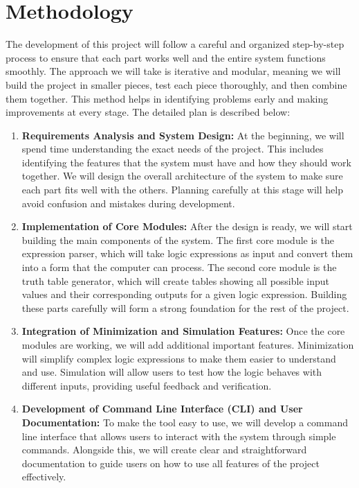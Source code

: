 \section{Methodology}

The development of this project will follow a careful and organized step-by-step process to ensure that each part works well and the entire system functions smoothly. The approach we will take is iterative and modular, meaning we will build the project in smaller pieces, test each piece thoroughly, and then combine them together. This method helps in identifying problems early and making improvements at every stage. The detailed plan is described below:

\begin{enumerate}
    \item \textbf{Requirements Analysis and System Design:} At the beginning, we will spend time understanding the exact needs of the project. This includes identifying the features that the system must have and how they should work together. We will design the overall architecture of the system to make sure each part fits well with the others. Planning carefully at this stage will help avoid confusion and mistakes during development.

    \item \textbf{Implementation of Core Modules:} After the design is ready, we will start building the main components of the system. The first core module is the expression parser, which will take logic expressions as input and convert them into a form that the computer can process. The second core module is the truth table generator, which will create tables showing all possible input values and their corresponding outputs for a given logic expression. Building these parts carefully will form a strong foundation for the rest of the project.

    \item \textbf{Integration of Minimization and Simulation Features:} Once the core modules are working, we will add additional important features. Minimization will simplify complex logic expressions to make them easier to understand and use. Simulation will allow users to test how the logic behaves with different inputs, providing useful feedback and verification.

    \item \textbf{Development of Command Line Interface (CLI) and User Documentation:} To make the tool easy to use, we will develop a command line interface that allows users to interact with the system through simple commands. Alongside this, we will create clear and straightforward documentation to guide users on how to use all features of the project effectively.


\end{enumerate}
